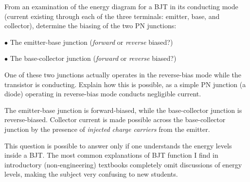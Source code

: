 

From an examination of the energy diagram for a BJT in its conducting mode (current existing through each of the three terminals: emitter, base, and collector), determine the biasing of the two PN junctions:

\medskip
\item{$\bullet$} The emitter-base junction ({\it forward} or {\it reverse} biased?)
\item{$\bullet$} The base-collector junction ({\it forward} or {\it reverse} biased?)
\medskip

One of these two junctions actually operates in the reverse-bias mode while the transistor is conducting.  Explain how this is possible, as a simple PN junction (a diode) operating in reverse-bias mode conducts negligible current.







The emitter-base junction is forward-biased, while the base-collector junction is reverse-biased.  Collector current is made possible across the base-collector junction by the presence of {\it injected charge carriers} from the emitter.







This question is possible to answer only if one understands the energy levels inside a BJT.  The most common explanations of BJT function I find in introductory (non-engineering) textbooks completely omit discussions of energy levels, making the subject very confusing to new students.




